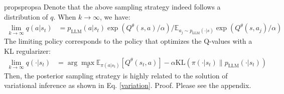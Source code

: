 \documentclass{article} %
\theoremstyle{plain}
\theoremstyle{definition}
\theoremstyle{remark}
\newcommand{\eq}{{Eq. }}
\newcommand{\yan}[1]{{ \color{blue}[yan: #1]}}
\begin{document}
{\begin{restatable}{props}{propsa}
\label{proposition}
Denote that the above sampling strategy indeed follows a distribution of $q$. When $k\rightarrow \infty$, we have:
\begin{equation}
\begin{aligned}
    \lim_{k\rightarrow\infty} q(a|s_t)&=  p_\text{LLM}(a|s_t){\exp( Q^\theta(s,a)/\alpha)}/{\mathbb{E}_{a_j \sim p_\text{LLM}(\cdot|s)} \exp( Q^\theta(s,a_j)/\alpha)}
\end{aligned}
\end{equation}
The limiting policy corresponds to the policy that optimizes the Q-values with a KL regularizer:
\begin{equation}
\begin{aligned}
        \lim_{k\rightarrow\infty} q(\cdot|s_t)&= \arg\max _\pi \mathbb{E}_{\pi(a|s_t)} [Q^\theta(s_t,a)]-\alpha \text{KL}\left(\pi(\cdot|s_t)\|p_\text{LLM}(\cdot|s_t)\right)
\end{aligned}
\end{equation}
Then, the posterior sampling strategy is highly related to the solution of variational inference as shown in \eq \ref{variation}. %
Proof. Please see the appendix. %
\end{restatable}




}
\end{document}
